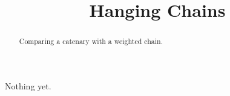 \documentclass{ximera}
\title{Hanging Chains}
\begin{document}
\begin{abstract}
Comparing a catenary with a weighted chain.
\end{abstract}
\maketitle


Nothing yet.
\end{document}
